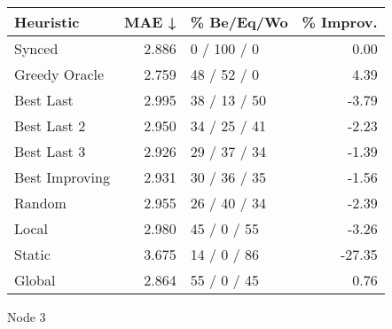\begin{tabular}{lrlr}
\toprule
\textbf{Heuristic} & \textbf{MAE ↓} & \textbf{\% Be/Eq/Wo} & \textbf{\% Improv.} \\
\midrule
            Synced &          2.886 &          0 / 100 / 0 &                0.00 \\
     Greedy Oracle &          2.759 &          48 / 52 / 0 &                4.39 \\
         Best Last &          2.995 &         38 / 13 / 50 &               -3.79 \\
       Best Last 2 &          2.950 &         34 / 25 / 41 &               -2.23 \\
       Best Last 3 &          2.926 &         29 / 37 / 34 &               -1.39 \\
    Best Improving &          2.931 &         30 / 36 / 35 &               -1.56 \\
            Random &          2.955 &         26 / 40 / 34 &               -2.39 \\
             Local &          2.980 &          45 / 0 / 55 &               -3.26 \\
            Static &          3.675 &          14 / 0 / 86 &              -27.35 \\
            Global &          2.864 &          55 / 0 / 45 &                0.76 \\
\bottomrule
\end{tabular}
\caption{Node 3}
\label{tab:hr_non_lr05_le2_bs2_3}
